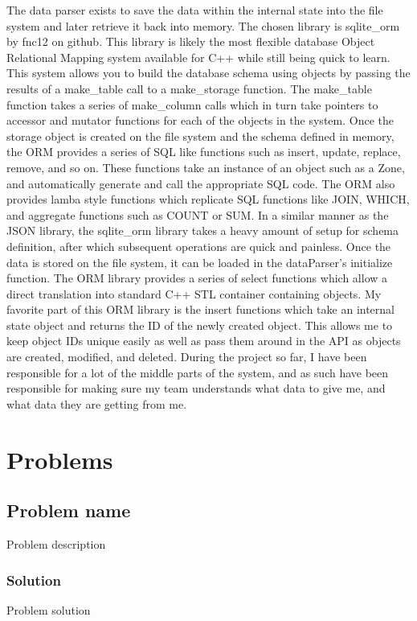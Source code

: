 \documentclass[onecolumn, draftclsnofoot,10pt, compsoc]{IEEEtran}
\begin{document}
	The data parser exists to save the data within the internal state into the file system and later retrieve it back into memory.
	The chosen library is sqlite\_orm by fnc12 on github.
	This library is likely the most flexible database Object Relational Mapping system available for C++ while still being quick to learn.
	This system allows you to build the database schema using objects by passing the results of a make\_table call to a make\_storage function.
	The make\_table function takes a series of make\_column calls which in turn take pointers to accessor and mutator functions for each of the objects in the system.
	Once the storage object is created on the file system and the schema defined in memory, the ORM provides a series of SQL like functions such as insert, update, replace, remove, and so on.
	These functions take an instance of an object such as a Zone, and automatically generate and call the appropriate SQL code.
	The ORM also provides lamba style functions which replicate SQL functions like JOIN, WHICH, and aggregate functions such as COUNT or SUM.
	In a similar manner as the JSON library, the sqlite\_orm library takes a heavy amount of setup for schema definition, after which subsequent operations are quick and painless.
	Once the data is stored on the file system, it can be loaded in the dataParser’s initialize function.
	The ORM library provides a series of select functions which allow a direct translation into standard C++ STL container containing objects.
	My favorite part of this ORM library is the insert functions which take an internal state object and returns the ID of the newly created object.
	This allows me to keep object IDs unique easily as well as pass them around in the API as objects are created, modified, and deleted.
	During the project so far, I have been responsible for a lot of the middle parts of the system, and as such have been responsible for making sure my team understands what data to give me, and what data they are getting from me.



	\section{Problems}
		\subsection{Problem name}
			Problem description
		\subsubsection{Solution}
				Problem solution
\end{document}
